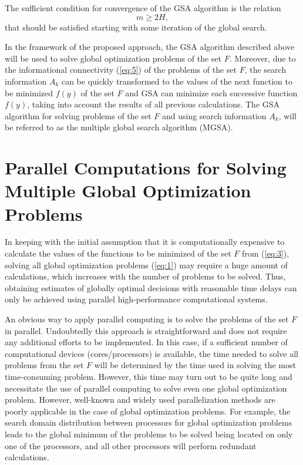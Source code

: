 \documentclass[review]{elsarticle}
\begin{document}
The sufficient condition for convergence of the GSA algorithm is the relation
\begin{equation}\label{eq:24}
m \geq 2H,
\end{equation}
that should be satisfied starting with some iteration of the global search. 

In the framework of the proposed approach, the GSA algorithm described above will be used to solve global optimization problems of the set $F$. Moreover, due to the informational connectivity (\ref{eq:5}) of the problems of the set $F$, the search information $A_k$ can be quickly transformed to the values of the next function to be minimized $f(y)$ of the set $F$ and GSA can minimize each successive function $f(y)$, taking into account the results of all previous calculations. The GSA algorithm for solving problems of the set $F$ and using search information $A_k$, will be referred to as the multiple global search algorithm (MGSA).


\section{Parallel Computations for Solving Multiple Global Optimization Problems}\label{sec:4}

In keeping with the initial assumption that it is computationally expensive to calculate the values of the functions to be minimized of the set $F$ from (\ref{eq:3}), solving all global optimization problems (\ref{eq:1}) may require a huge amount of calculations, which increases with the number of problems to be solved. Thus, obtaining estimates of globally optimal decisions with reasonable time delays can only be achieved using parallel high-performance computational systems. 

An obvious way to apply parallel computing is to solve the problems of the set $F$ in parallel. Undoubtedly this approach is straightforward and does not require any additional efforts to be  implemented. In this case, if a sufficient number of computational devices ({cores/processors}) is available, the time needed to solve all problems from the set $F$ will be determined by the time used in solving the most time-consuming problem. However, this time may turn out to be quite long and necessitate the use of parallel computing to solve even one global optimization problem. However, well-known and widely used parallelization methods are poorly applicable in the case of global optimization problems. For example, the search domain distribution between processors for global optimization problems leads to the global minimum of the problems to be solved being located on only one of the processors, and all other processors will perform redundant calculations.
\end{document}
